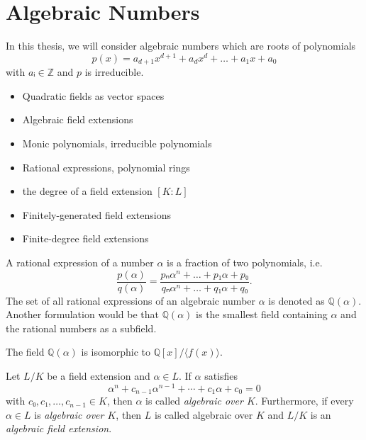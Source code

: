 \begin{example}
\end{example}


\section{Algebraic Numbers}

In this thesis, we will consider algebraic numbers which are roots of polynomials
\[
  p(x) = a_{d+1} x^{d+1} + a_d x^d + \dots + a_1 x + a_0
\]
with $aᵢ ∈ ℤ$ and $p$ is irreducible.

\begin{itemize}
  \item Quadratic fields as vector spaces
  \item Algebraic field extensions
  \item Monic polynomials, irreducible polynomials
  \item Rational expressions, polynomial rings
  \item the degree of a field extension $[K : L]$
  \item Finitely-generated field extensions
  \item Finite-degree field extensions
\end{itemize}

A rational expression of a number $α$ is a fraction of two polynomials, i.e.
\[
  \frac{p(α)}{q(α)} = \frac{pₙ α^n + \dots + p₁ α + p₀}{qₙ α^n + \dots + q₁ α + q₀}.
\]
The set of all rational expressions of an algebraic number $α$ is denoted as $ℚ(α)$.
Another formulation would be that $ℚ(α)$ is the smallest field containing $α$
and the rational numbers as a subfield.

\begin{theorem}
  The field $ℚ(α)$ is isomorphic to $ℚ[x]/⟨f(x)⟩$.
\end{theorem}

\begin{definition}
  Let $L/K$ be a field extension and $α ∈ L$.
  If $α$ satisfies
  \[
    α^n + c_{n-1} α^{n-1} + ⋯ + c_1 α + c_0 = 0
  \]
  with $c₀, c₁, …, c_{n-1} ∈ K$,
  then $α$ is called \emph{algebraic over $K$}.
  Furthermore, if every $α ∈ L$ is \emph{algebraic over $K$}, then $L$ is called
  algebraic over $K$ and $L/K$ is an \emph{algebraic field extension}.
\end{definition}

